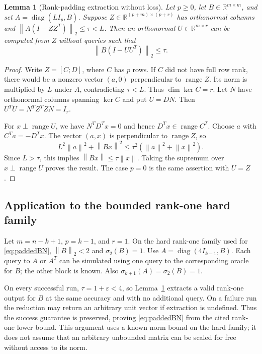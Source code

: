 \documentclass[11pt]{article}
\numberwithin{equation}{section}
\newtheorem{lemma}[theorem]{Lemma}
\theoremstyle{definition}
\newcommand{\R}{\mathbb R}
\newcommand{\norm}[1]{\left\lVert#1\right\rVert}
\newcommand{\range}{\operatorname{range}}
\newcommand{\diag}{\operatorname{diag}}
\newcommand{\eps}{\varepsilon}
\begin{document}
\begin{lemma}[Rank-padding extraction without loss]
\label{lem:padding}
Let $p\ge0$, let $B\in\R^{m\times m}$, and set
$A=\diag(LI_p,B)$. Suppose $Z\in\R^{(p+m)\times(p+r)}$ has orthonormal
columns and $\norm{A(I-ZZ^T)}_2\le\tau<L$. Then an orthonormal
$U\in\R^{m\times r}$ can be computed from $Z$ without queries such that
\begin{equation}
 \norm{B(I-UU^T)}_2\le\tau.
 \label{eq:paddingconclusion}
\end{equation}
\end{lemma}
\begin{proof}
Write $Z=[C;D]$, where $C$ has $p$ rows. If $C$ did not have full row rank,
there would be a nonzero vector $(a,0)$ perpendicular to $\range Z$.
Its norm is multiplied by $L$ under $A$, contradicting $\tau<L$.
Thus $\dim\ker C=r$. Let $N$ have orthonormal columns spanning $\ker C$
and put $U=DN$. Then
$U^TU=N^TZ^TZN=I_r$.

For $x\perp\range U$, we have $N^TD^Tx=0$ and hence
$D^Tx\in\range C^T$. Choose $a$ with $C^Ta=-D^Tx$.
The vector $(a,x)$ is perpendicular to $\range Z$, so
\[
 L^2\norm a^2+\norm{Bx}^2
 \le\tau^2(\norm a^2+\norm x^2).
\]
Since $L>\tau$, this implies $\norm{Bx}\le\tau\norm x$.
Taking the supremum over $x\perp\range U$ proves the result.
The case $p=0$ is the same assertion with $U=Z$.
\end{proof}

\subsection{Application to the bounded rank-one hard family}
Let $m=n-k+1$, $p=k-1$, and $r=1$. On the hard rank-one family used for
\eqref{eq:paddedBN}, $\norm B_2<2$ and $\sigma_2(B)=1$. Use
$A=\diag(4I_{k-1},B)$. Each query to $A$ or $A^T$ can be simulated using
one query to the corresponding oracle for $B$; the other block is known.
Also $\sigma_{k+1}(A)=\sigma_2(B)=1$.

On every successful run, $\tau=1+\eps<4$, so
Lemma~\ref{lem:padding} extracts a valid rank-one output for $B$ at the
same accuracy and with no additional query. On a failure run the reduction
may return an arbitrary unit vector if extraction is undefined. Thus the
success guarantee is preserved, proving \eqref{eq:paddedBN} from the cited
rank-one lower bound. This argument uses a known norm bound on the hard
family; it does not assume that an arbitrary unbounded matrix can be scaled
for free without access to its norm.
\end{document}
